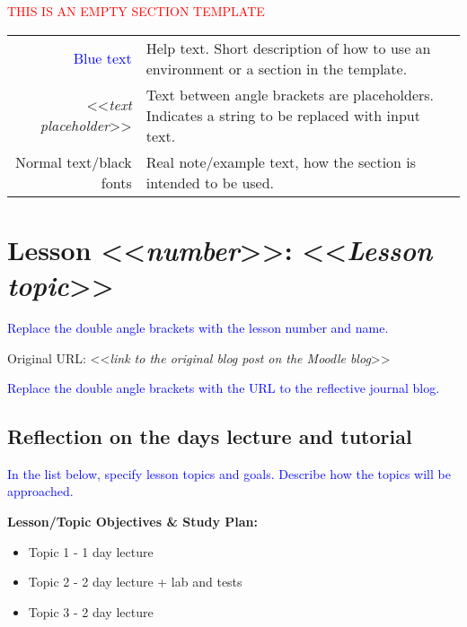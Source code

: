 

{\begin{center}
    \textcolor{red}{\Huge{THIS IS AN EMPTY SECTION TEMPLATE}}

    \begin{tabular}{r @{: } p{80mm}}
        {\textcolor{blue}{Blue text}} &  Help text. Short description of how to use an environment or a section in the template.\\
        <<{\emph{text placeholder}}>> & Text between angle brackets are placeholders. Indicates a string to be replaced with input text.\\
        Normal text/black fonts & Real note/example text, how the section is intended to be used.
    \end{tabular}

\end{center}


\section{Lesson <<{\emph{number}}>>: <<{\emph{Lesson topic}}>>}

{\textcolor{blue}{Replace the double angle brackets with the lesson number and name.}}

Original URL: <<{\emph{link to the original blog post on the Moodle blog}}>>

{\textcolor{blue}{Replace the double angle brackets with the URL to the reflective journal blog.}}


\subsection{Reflection on the days lecture and tutorial}

{\textcolor{blue}{In the list below, specify lesson topics and goals. Describe how the topics will be approached.}}

{\bfseries{Lesson/Topic Objectives \& Study Plan:}}
\begin{itemize}
    \item Topic 1 - 1 day lecture
    \item Topic 2 - 2 day lecture + lab and tests
    \item Topic 3 - 2 day lecture
\end{itemize}


}
